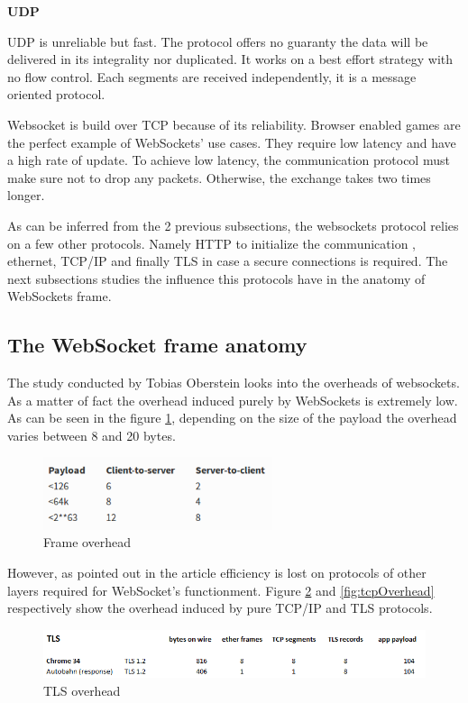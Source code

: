 \textbf{UDP}

UDP is unreliable but fast. The protocol offers no guaranty the data will be
delivered in its integrality nor duplicated. It works on a best effort strategy
with no flow control. Each segments are received independently, it is a message
oriented protocol.

Websocket is build over TCP because of its reliability. Browser enabled games
are the perfect example of WebSockets' use cases. They require low latency and
have a high rate of update. To achieve low latency, the communication protocol
must make sure not to drop any packets. Otherwise, the exchange takes two times
longer.

As can be inferred from the 2 previous subsections, the websockets protocol
relies on a few other protocols. Namely HTTP to initialize the communication ,
ethernet, TCP/IP and finally TLS in case a secure connections is required.  The
next subsections studies the influence this protocols have in the anatomy of
WebSockets frame.

\subsection{The WebSocket frame anatomy}

The study conducted by Tobias Oberstein \citep{Reference30} looks into the
overheads of websockets. As a matter of fact the overhead induced purely by
WebSockets is extremely low. As can be seen in the figure
\ref{fig:frameOverhead}, depending on the size of the payload the overhead
varies between 8 and 20 bytes.

\begin{figure}[H]
\centering
\includegraphics[width=0.6\textwidth]{./Figures/frame_overhead.png}
\caption[Frame overhead]{Frame overhead \citep{Reference30}}
\label{fig:frameOverhead}
\end{figure}

However, as pointed out in the article efficiency is lost on protocols of other layers
required for WebSocket's functionment. Figure \ref{fig:tlsOverhead} and
\ref{fig:tcpOverhead} respectively show the overhead induced by pure TCP/IP and
TLS protocols.

\begin{figure}[H]
\centering
\includegraphics[width=\textwidth]{./Figures/tls_overhead.png}
\caption[TLS overhead]{TLS overhead \citep{Reference30}}
\label{fig:tlsOverhead}
\end{figure}

